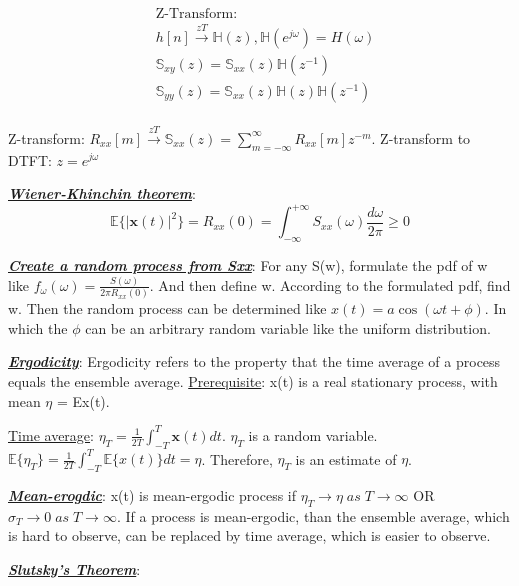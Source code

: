 \documentclass[12pt]{article}
\newcommand{\bulletPoint}[1]{\ul{\textit{\textbf{#1}}}}
\begin{document}
\begin{multicols*}{4}
\useshortskip \begin{equation*}
    \begin{split}
    & \text{Z-Transform:}\\[-5pt]
    &h[n]\xrightarrow{zT} \mathbb{H}(z), \mathbb{H}(e^{j\omega})=H(\omega)\\[-3pt]
    & \mathbb{S}_{xy}(z) = \mathbb{S}_{xx}(z)\mathbb{H}(z^{-1})\\[-3pt]
    & \mathbb{S}_{yy}(z) = \mathbb{S}_{xx}(z)\mathbb{H}(z)\mathbb{H}(z^{-1})\\[-7pt]
    \end{split}
\end{equation*}

Z-transform: $R_{xx}[m] \xrightarrow{zT} \mathbb{S}_{xx}(z) = \sum^\infty_{m=-\infty}R_{xx}[m]z^{-m}$. Z-transform to DTFT: $z=e^{j\omega}$


\bulletPoint{Wiener-Khinchin theorem}: 
\useshortskip \begin{equation*}
    \mathbb{E}\{ |\mathbf{x}(t)|^2 \} = R_{xx}(0) = \int^{+\infty}_{-\infty}S_{xx}(\omega)\frac{d\omega}{2\pi} \geq 0
\end{equation*}


\bulletPoint{Create a random process from Sxx}:
For any S(w), formulate the pdf of w like $f_{\omega}(\omega) = \frac{S(\omega)}{2\pi R_{xx}(0)}$. And then define w. According to the formulated pdf, find w. Then the random process can be determined like $x(t) = a \cos(\omega t + \phi)$. In which the $\phi$ can be an arbitrary random variable like the uniform distribution.


\bulletPoint{Ergodicity}: Ergodicity refers to the property that the time average of a process equals the ensemble average. \underline{Prerequisite}: x(t) is a real stationary process, with mean $\eta$ = E{x(t)}. 

\underline{Time average}: $\mathbb{\eta}_T = \frac{1}{2T}\int^T_{-T}\mathbf{x}(t)dt$. $\eta_T$ is a random variable. $\mathbb{E}\{\eta_T\} = \frac{1}{2T}\int^T_{-T}\mathbb{E}\{\mathbf{}{x}(t)\}dt = \eta$. Therefore, $\eta_T$ is an estimate of $\eta$.


\bulletPoint{Mean-erogdic}: x(t) is mean-ergodic process if $\eta_T \rightarrow\eta \; as \; T\rightarrow\infty$ OR $\sigma_T \rightarrow 0 \; as \;  T\rightarrow \infty$. If a process is mean-ergodic, than the ensemble average, which is hard to observe, can be replaced by time average, which is easier to observe.


\bulletPoint{Slutsky's Theorem}:


\end{multicols*}
\end{document}
